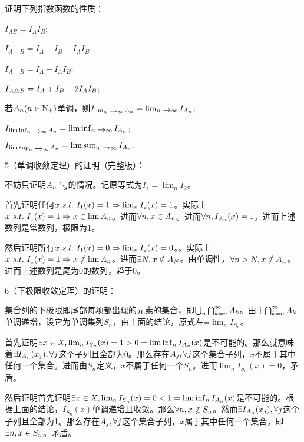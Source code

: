 \begin{yxlb}
\item 证明下列指数函数的性质：

\begin{yxlb}
\item $I_{AB}=I_AI_B$; 
\item $I_{A+B}=I_A+I_B-I_AI_B$; 
\item $I_{A-B}=I_A-I_AI_B$; 
\item $I_{A\triangle B}=I_A+I_B-2I_AI_B$;
\item 若$A_n(n\in\mbox{$\mathbb N$}_+)$单调，则$I_{\lim_{n\mbox{$\;\to$}\infty}A_n}=\lim_{n\mbox{$\;\to$}\infty}I_{A_n}$;
\item $I_{\liminf_{n\mbox{$\;\to$}\infty}A_n}=\liminf_{n\mbox{$\;\to$}\infty}I_{A_n}$;
\item $I_{\limsup_{n\mbox{$\;\to$}\infty}A_n}=\limsup_{n\mbox{$\;\to$}\infty}I_{A_n}.$

\end{yxlb}

5（单调收敛定理）的证明（完整版）：

不妨只证明$A_n\searrow$的情况。记原等式为$I_1=\lim_n I_2$。

首先证明任何$x\ s.t.\ I_1(x)=1 \Rightarrow \lim_n I_2(x)=1$。实际上$x\ s.t.\ I_1(x)=1 \tuichu x \sy \lim A_n$。进而$\forall n,x \in A_n$。进而$\forall n,I_{A_n}(x)=1$。进而上述数列是常数列，极限为1。

然后证明所有$x\ s.t.\ I_1(x)=0 \Rightarrow \lim_n I_2(x)=0$。。实际上$x\ s.t.\ I_1(x)=1 \tuichu x \bsy \lim A_n$。进而$\exists N,x \notin A_N$。由单调性，$\forall n>N, x \notin A_n$。进而上述数列是尾为0的数列，趋于0。

6（下极限收敛定理）的证明：

集合列的下极限即尾部每项都出现的元素的集合，即$\bigcup_n\bigcap_{k=n}^\infty A_k$。由于$\bigcap_{k=n}^\infty A_k$单调递增，设它为单调集列$S_n$，由上面的结论，原式左=$\lim_n I_{S_n}$。

首先证明$\exists x\in X, \lim_n I_{S_n}(x)=1>0=\liminf_n I_{A_n}(x)$是不可能的。那么就意味着$\exists I_{A_n}(x_j), \forall j$这个子列且全部为0。那么存在$A_j,\forall j$这个集合子列，$x$不属于其中任何一个集合。进而由$S_n$定义，$x$不属于任何一个$S_n$。进而$\lim_n I_{S_n}(x)=0$，矛盾。

然后证明首先证明$\exists x\in X, \lim_n I_{S_n}(x)=0<1=\liminf_n I_{A_n}(x)$是不可能的。根据上面的结论，$I_{S_n}(x)$单调递增且收敛。那么$\forall n, x\notin S_n$。然而$\exists I_{A_n}(x_j), \forall j$这个子列且全部为1。那么存在$A_j,\forall j$这个集合子列，$x$属于其中任何一个集合，即$\exists n, x\in S_n$。矛盾。


\end{yxlb}
